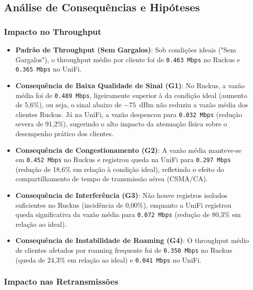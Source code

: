 \subsection{Análise de Consequências e Hipóteses}

\subsubsection{Impacto no Throughput}

\begin{itemize}
  \item \textbf{Padrão de Throughput (Sem Gargalos)}: Sob condições ideais ("Sem Gargalos"), o throughput médio por cliente foi de \texttt{0.463 Mbps} no Ruckus e \texttt{0.365 Mbps} no UniFi.
  \item \textbf{Consequência de Baixa Qualidade de Sinal (G1)}: No Ruckus, a vazão média foi de \texttt{0.489 Mbps}, ligeiramente superior à da condição ideal (aumento de 5,6\%), ou seja, o sinal abaixo de $-75$~dBm não reduziu a vazão média dos clientes Ruckus. Já na UniFi, a vazão despencou para \texttt{0.032 Mbps} (redução severa de 91,2\%), sugerindo o alto impacto da atenuação física sobre o desempenho prático dos clientes.
  \item \textbf{Consequência de Congestionamento (G2)}: A vazão média manteve-se em \texttt{0.452 Mbps} no Ruckus e registrou queda na UniFi para \texttt{0.297 Mbps} (redução de 18,6\% em relação à condição ideal), refletindo o efeito do compartilhamento de tempo de transmissão aérea (CSMA/CA).
  \item \textbf{Consequência de Interferência (G3)}: Não houve registros isolados suficientes no Ruckus (incidência de 0,00\%), enquanto a UniFi registrou queda significativa da vazão média para \texttt{0.072 Mbps} (redução de 80,3\% em relação ao ideal).
  \item \textbf{Consequência de Instabilidade de Roaming (G4)}: O throughput médio de clientes afetados por roaming frequente foi de \texttt{0.350 Mbps} no Ruckus (queda de 24,3\% em relação ao ideal) e \texttt{0.041 Mbps} no UniFi.

\end{itemize}
\subsubsection{Impacto nas Retransmissões}


